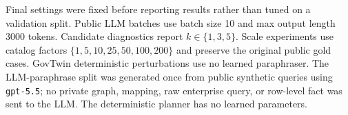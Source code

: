 \documentclass[letterpaper]{article}
\begin{document}
Final settings were fixed before reporting results rather than tuned on a validation split. Public LLM batches use batch size 10 and max output length 3000 tokens. Candidate diagnostics report $k\in\{1,3,5\}$. Scale experiments use catalog factors $\{1,5,10,25,50,100,200\}$ and preserve the original public gold cases. GovTwin deterministic perturbations use no learned paraphraser. The LLM-paraphrase split was generated once from public synthetic queries using \texttt{gpt-5.5}; no private graph, mapping, raw enterprise query, or row-level fact was sent to the LLM. The deterministic planner has no learned parameters.
\end{document}
